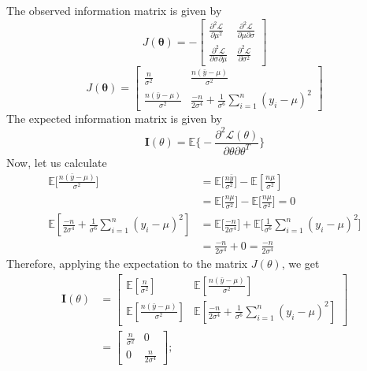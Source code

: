 \documentclass[11pt]{article}
\begin{document}
The observed information matrix is given by
\begin{equation}
  \nonumber
  J(\mathbf{\theta}) = -
  \begin{bmatrix}
    \frac{\partial^{2} \mathcal{L}}{\partial \mu^{2}} & \frac{\partial^{2} \mathcal{L}}{\partial \mu \partial \sigma}\\
    \frac{\partial^{2} \mathcal{L}}{\partial \sigma \partial \mu} & \frac{\partial^{2} \mathcal{L}}{\partial \sigma^{2}}
  \end{bmatrix}
\end{equation}
\begin{equation}
  \nonumber
  J(\mathbf{\theta}) = \begin{bmatrix}
    \frac{n}{\sigma^{2}} & \frac{n(\bar{y} - \mu)}{\sigma^{2}}\\
    \frac{n(\bar{y} - \mu)}{\sigma^{2}} & \frac{-n}{2\sigma^{4}} + \frac{1}{\sigma^{6}}\sum_{i = 1}^{n}(y_{i} - \mu)^{2}
\end{bmatrix}
\end{equation}
The expected information matrix is given by
\begin{equation}
  \nonumber
  \mathbf{I}(\theta) = \mathbb{E}\bigg\{-\frac{\partial^{2} \mathcal{L}(\theta)}{\partial \theta \partial \theta^{T}}\bigg\}
\end{equation}
Now, let us calculate
\begin{equation}
  \nonumber
  \begin{aligned}
    \mathbb{E}\bigg[\frac{n(\bar{y} - \mu)}{\sigma^{2}}\bigg] & = \mathbb{E}\bigg[\frac{n\bar{y}}{\sigma^{2}}\bigg] - \mathbb{E}[\frac{n\mu}{\sigma^{2}}]\\
    & = \mathbb{E}\bigg[\frac{n\mu}{\sigma^{2}}\bigg] - \mathbb{E}\bigg[\frac{n\mu}{\sigma^{2}}\bigg] = 0\\
    \mathbb{E}[\frac{-n}{2\sigma^{4}} + \frac{1}{\sigma^{6}}\sum_{i = 1}^{n}(y_{i} - \mu)^{2}] & = \mathbb{E}\bigg[\frac{-n}{2\sigma^{4}}\bigg] + \mathbb{E}\bigg[\frac{1}{\sigma^{6}}\sum_{i = 1}^{n}(y_{i} - \mu)^{2}\bigg]\\
    & = \frac{-n}{2\sigma^{4}} + 0 = \frac{-n}{2\sigma^{4}}
  \end{aligned}
\end{equation}
Therefore, applying the expectation to the matrix $J(\theta)$, we get
\begin{equation}
  \nonumber
  \begin{aligned}
    \mathbf{I}(\theta) & = \begin{bmatrix}
    \mathbb{E}[\frac{n}{\sigma^{2}}] & \mathbb{E}[\frac{n(\bar{y} - \mu)}{\sigma^{2}}]\\
    \mathbb{E}[\frac{n(\bar{y} - \mu)}{\sigma^{2}}] & \mathbb{E}[\frac{-n}{2\sigma^{4}} + \frac{1}{\sigma^{6}}\sum_{i = 1}^{n}(y_{i} - \mu)^{2}]
  \end{bmatrix}\\
    & = \begin{bmatrix}
    \frac{n}{\sigma^{2}} & 0\\
    0 & \frac{n}{2\sigma^{4}}
        \end{bmatrix};
  \end{aligned}
\end{equation}
\end{document}
